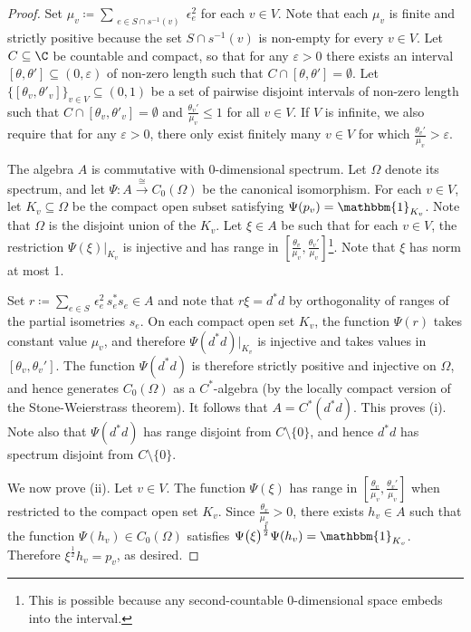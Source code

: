 \documentclass[12pt, a4paper]
{amsart}
\theoremstyle{definition}
\theoremstyle{remark}
\numberwithin{equation}{section}
\newcommand{\Cstar}{\ensuremath{C^*}}
\begin{document}
\begin{proof}
    Set $\mu_v \coloneq \sum_{\substack{e \in S \cap s^{-1}(v)}} \epsilon_e^2$ for each $v \in V$. Note that each $\mu_v$ is finite and strictly positive because the set $S \cap s^{-1}(v)$ is non-empty for every $v \in V$. Let $C \subseteq \C$ be countable and compact, so that for any $\varepsilon>0$ there exists an interval $[\theta, \theta'] \subseteq (0,\varepsilon)$ of non-zero length such that $C\cap [\theta,\theta']=\emptyset$. Let $\big\{[\theta_v,\theta'_v]\big\}_{v \in V} \subseteq (0, 1)$ be a set of pairwise disjoint intervals of non-zero length such that $C\cap [\theta_v,\theta'_v]=\emptyset$ and $\frac{\theta_v'}{\mu_v} \le 1$ for all $v \in V$. If $V$ is infinite, we also require that for any $\varepsilon >0$, there only exist finitely many $v \in V$ for which $\frac{\theta_v'}{\mu_v} > \varepsilon$.
    
    The algebra $A$ is commutative with 0-dimensional spectrum. Let $\Omega$ denote its spectrum, and let $\Psi \colon A \xrightarrow{\cong} C_0(\Omega)$ be the canonical isomorphism. For each $v \in V$, let $K_v \subseteq \Omega$ be the compact open subset satisfying $\Psi(p_v) = \mathbbm{1}_{K_v}$. Note that $\Omega$ is the disjoint union of the $K_v$. Let $\xi \in A$ be such that for each $v \in V$, the restriction $\Psi(\xi)|_{K_v}$ is injective and has range in $[\frac{\theta_v}{\mu_v}, \frac{\theta_v'}{\mu_v}]$\footnote{This is possible because any second-countable 0-dimensional space embeds into the interval.}. Note that $\xi$ has norm at most 1.
    
    Set
    $
    r \coloneq \sum_{e \in S} \, \epsilon_e^2 \, s_e^* s_e \in A
    $
    and note that $r\xi = d^*d$ by orthogonality of ranges of the partial isometries $s_e$. On each compact open set $K_v$, the function $\Psi(r)$ takes constant value $\mu_v$, and therefore $\Psi(d^*d)|_{K_v}$ is injective and takes values in $[\theta_v, \theta_v']$. The function $\Psi(d^*d)$ is therefore strictly positive and injective on $\Omega$, and hence generates $C_0(\Omega)$ as a $\Cstar$-algebra (by the locally compact version of the Stone-Weierstrass theorem). It follows that $A = C^*(d^*d)$. This proves (i). Note also that $\Psi(d^*d)$ has range disjoint from $C \setminus \{0\}$, and hence $d^*d$ has spectrum disjoint from $C \setminus \{0\}$.

    We now prove (ii). Let $v \in V$. The function $\Psi(\xi)$ has range in $[\frac{\theta_{v}}{\mu_{v}}, \frac{\theta_{v}'}{\mu_{v}}]$ when restricted to the compact open set $K_{v}$. Since $\frac{\theta_{v}}{\mu_{v}} >0 $, there exists $h_v \in A$ such that the function $\Psi(h_v) \in C_0(\Omega)$ satisfies $\Psi\big(\xi\big)^{\frac{1}{2}} \Psi(h_v) = \mathbbm{1}_{K_{v}}$. Therefore $\xi^{\frac{1}{2}}h_v = p_v$, as desired.
\end{proof}
\end{document}
